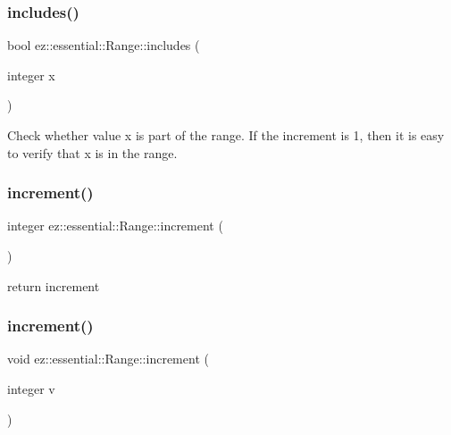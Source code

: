 \subsubsection{\texorpdfstring{includes()}{includes()}}
{\footnotesize\ttfamily bool ez\+::essential\+::\+Range\+::includes (\begin{DoxyParamCaption}\item[{integer}]{x }\end{DoxyParamCaption})\hspace{0.3cm}{\ttfamily [inline]}}

Check whether value x is part of the range. If the increment is 1, then it is easy to verify that x is in the range. \mbox{\label{classez_1_1essential_1_1Range_ab31db0c8d2d5339b5146f9a203ced4a4}} 
\subsubsection{\texorpdfstring{increment()}{increment()}\hspace{0.1cm}{\footnotesize\ttfamily [1/2]}}
{\footnotesize\ttfamily integer ez\+::essential\+::\+Range\+::increment (\begin{DoxyParamCaption}{ }\end{DoxyParamCaption})\hspace{0.3cm}{\ttfamily [inline]}}

return increment \mbox{\label{classez_1_1essential_1_1Range_af5cb29600994f95a5d7042c6163c3da3}} 
\subsubsection{\texorpdfstring{increment()}{increment()}\hspace{0.1cm}{\footnotesize\ttfamily [2/2]}}
{\footnotesize\ttfamily void ez\+::essential\+::\+Range\+::increment (\begin{DoxyParamCaption}\item[{integer}]{v }\end{DoxyParamCaption})\hspace{0.3cm}{\ttfamily [inline]}}

